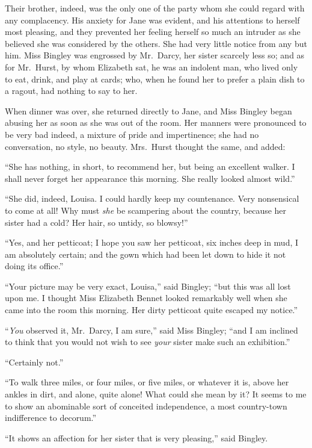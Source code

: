 \documentclass[12pt,english]{book}
\begin{document}
Their brother, indeed, was the only one of the party whom she could
regard with any complacency. His anxiety for Jane was evident, and
his attentions to herself most pleasing, and they prevented her feeling
herself so much an intruder as she believed she was considered by
the others. She had very little notice from any but him. Miss Bingley
was engrossed by Mr.\ Darcy, her sister scarcely less so; and as
for Mr.\ Hurst, by whom Elizabeth sat, he was an indolent man, who
lived only to eat, drink, and play at cards; who, when he found her
to prefer a plain dish to a ragout, had nothing to say to her.

When dinner was over, she returned directly to Jane, and Miss Bingley
began abusing her as soon as she was out of the room. Her manners
were pronounced to be very bad indeed, a mixture of pride and impertinence;
she had no conversation, no style, no beauty. Mrs.\ Hurst thought
the same, and added:

{}``She has nothing, in short, to recommend her, but being an excellent
walker. I shall never forget her appearance this morning. She really
looked almost wild.''

{}``She did, indeed, Louisa. I could hardly keep my countenance.
Very nonsensical to come at all! Why must \textit{she} be scampering
about the country, because her sister had a cold? Her hair, so untidy,
so blowsy!''\ 

{}``Yes, and her petticoat; I hope you saw her petticoat, six inches
deep in mud, I am absolutely certain; and the gown which had been
let down to hide it not doing its office.''

{}``Your picture may be very exact, Louisa,'' said Bingley; {}``but
this was all lost upon me. I thought Miss Elizabeth Bennet looked
remarkably well when she came into the room this morning. Her dirty
petticoat quite escaped my notice.''

{}``\textit{You} observed it, Mr.\ Darcy, I am sure,'' said Miss
Bingley; {}``and I am inclined to think that you would not wish to
see \textit{your} sister make such an exhibition.''

{}``Certainly not.''

{}``To walk three miles, or four miles, or five miles, or whatever
it is, above her ankles in dirt, and alone, quite alone! What could
she mean by it? It seems to me to show an abominable sort of conceited
independence, a most country-town indifference to decorum.''

{}``It shows an affection for her sister that is very pleasing,''
said Bingley.
\end{document}
